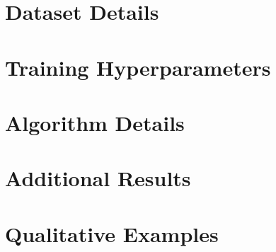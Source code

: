 \documentclass{article}
\begin{document}
\appendix

%
\section{Dataset Details}
\label{app:data}

\section{Training Hyperparameters}
\label{app:hp}

\section{Algorithm Details}
\label{app:algo}

\section{Additional Results}
\label{app:results}

\section{Qualitative Examples}
\label{app:examples}


\end{document}
